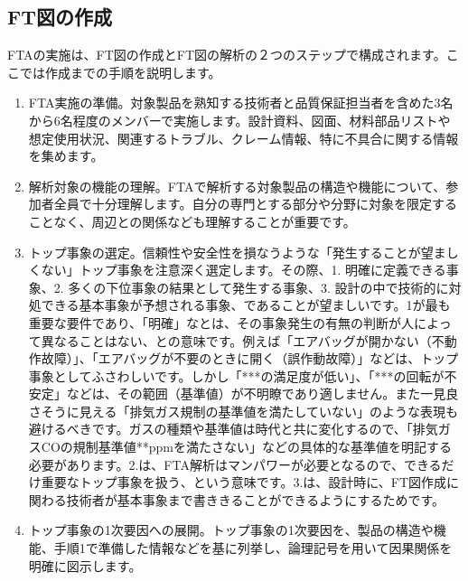 \subsection{FT図の作成}
FTAの実施は、FT図の作成とFT図の解析の２つのステップで構成されます。ここでは作成までの手順を説明します。
\begin{enumerate}
\item FTA実施の準備。対象製品を熟知する技術者と品質保証担当者を含めた3名から6名程度のメンバーで実施します。設計資料、図面、材料部品リストや想定使用状況、関連するトラブル、クレーム情報、特に不具合に関する情報を集めます。
\item 解析対象の機能の理解。FTAで解析する対象製品の構造や機能について、参加者全員で十分理解します。自分の専門とする部分や分野に対象を限定することなく、周辺との関係なども理解することが重要です。
\item トップ事象の選定。信頼性や安全性を損なうような「発生することが望ましくない」トップ事象を注意深く選定します。その際、1. 明確に定義できる事象、2. 多くの下位事象の結果として発生する事象、3. 設計の中で技術的に対処できる基本事象が予想される事象、であることが望ましいです。1が最も重要な要件であり、「明確」なとは、その事象発生の有無の判断が人によって異なることはない、との意味です。例えば「エアバッグが開かない（不動作故障）」、「エアバッグが不要のときに開く（誤作動故障）」などは、トップ事象としてふさわしいです。しかし「***の満足度が低い」、「***の回転が不安定」などは、その範囲（基準値）が不明瞭であり適しません。また一見良さそうに見える「排気ガス規制の基準値を満たしていない」のような表現も避けるべきです。ガスの種類や基準値は時代と共に変化するので、「排気ガスCOの規制基準値**ppmを満たさない」などの具体的な基準値を明記する必要があります。2.は、FTA解析はマンパワーが必要となるので、できるだけ重要なトップ事象を扱う、という意味です。3.は、設計時に、FT図作成に関わる技術者が基本事象まで書ききることができるようにするためです。
\item トップ事象の1次要因への展開。トップ事象の1次要因を、製品の構造や機能、手順1で準備した情報などを基に列挙し、論理記号を用いて因果関係を明確に図示します。


\end{enumerate}
